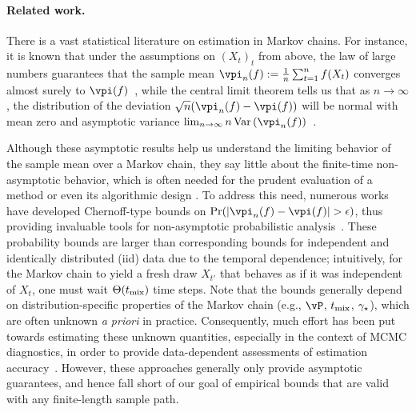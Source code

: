 \paragraph{Related work.}
There is a vast statistical literature on estimation in Markov chains.
For instance, it is known that under the assumptions on
$(X_t)_t$ from above, the law of large numbers guarantees that
the sample mean $\vpi_n(f) \defeq \frac1n \sum_{t=1}^n f(X_t)$
converges almost surely to $\vpi(f)$~\cite{meyn1993markov}, while the
central limit theorem tells us that as $n\to \infty$, the distribution
of the deviation $\sqrt{n}( \vpi_n(f)-\vpi(f))$ will be normal with
mean zero and asymptotic variance $\lim_{n\to\infty}
n\Var\Parens{\vpi_n(f)}$~\cite{kipnis1986central}.

Although these asymptotic results help us understand the limiting
behavior of the sample mean over a Markov chain, they say little about
the finite-time non-asymptotic behavior, which is often needed for the
prudent evaluation of a method or even its algorithmic design
\cite{
MCMCDiscussion93%
,DBLP:conf/valuetools/KontoyiannisLM06%
,BBL06%
,MniSzeAu08%
,MauPo09%
,LiLiWaSt11:KWIK%
,flegal2011implementing%
,Gyori-paulin15%
,SwaJoa15:LoggedBandit%
}. %
To address this need, numerous works have developed Chernoff-type
bounds on $\Pr\parens{ |\vpi_n(f)-\vpi(f)| > \eps }$, thus providing
invaluable tools for non-asymptotic probabilistic
analysis~\cite{gillman1998chernoff,leon2004optimal,DBLP:conf/valuetools/KontoyiannisLM06,paulin15}.
These probability bounds are larger than corresponding bounds for
independent and identically distributed (iid) data due to the temporal
dependence; intuitively, for the Markov chain to yield a fresh draw
$X_{t'}$ that behaves as if it was independent of $X_t$, one must wait
$\Theta(t_{\operatorname{mix}})$ time steps.
Note that the bounds generally depend on distribution-specific
properties of the Markov chain (e.g., $\vP$, $t_{\operatorname{mix}}$, $\gamma_{\star}$), which are often
unknown \emph{a priori} in practice.
Consequently, much effort has been put towards estimating these
unknown quantities, especially in the context of MCMC diagnostics, in
order to provide data-dependent assessments of estimation
accuracy~\cite[e.g.,][]{MCMCDiscussion93,GaSmi00:eigval,jones2001,flegal2011implementing,1209.0703,Gyori-paulin15}.
However, these approaches generally only provide asymptotic
guarantees, and hence fall short of our goal of empirical bounds that
are valid with any finite-length sample path.

